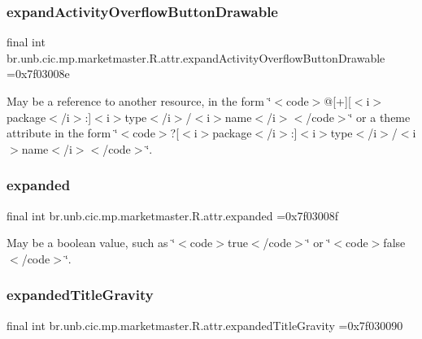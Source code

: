 \subsubsection{\texorpdfstring{expand\+Activity\+Overflow\+Button\+Drawable}{expandActivityOverflowButtonDrawable}}
{\footnotesize\ttfamily final int br.\+unb.\+cic.\+mp.\+marketmaster.\+R.\+attr.\+expand\+Activity\+Overflow\+Button\+Drawable =0x7f03008e\hspace{0.3cm}{\ttfamily [static]}}

May be a reference to another resource, in the form \char`\"{}$<$code$>$@\mbox{[}+\mbox{]}\mbox{[}$<$i$>$package$<$/i$>$\+:\mbox{]}$<$i$>$type$<$/i$>$/$<$i$>$name$<$/i$>$$<$/code$>$\char`\"{} or a theme attribute in the form \char`\"{}$<$code$>$?\mbox{[}$<$i$>$package$<$/i$>$\+:\mbox{]}$<$i$>$type$<$/i$>$/$<$i$>$name$<$/i$>$$<$/code$>$\char`\"{}. \mbox{\label{classbr_1_1unb_1_1cic_1_1mp_1_1marketmaster_1_1R_1_1attr_af0819ad4f4e9a998555b89b7beeaa2ed}} 
\subsubsection{\texorpdfstring{expanded}{expanded}}
{\footnotesize\ttfamily final int br.\+unb.\+cic.\+mp.\+marketmaster.\+R.\+attr.\+expanded =0x7f03008f\hspace{0.3cm}{\ttfamily [static]}}

May be a boolean value, such as \char`\"{}$<$code$>$true$<$/code$>$\char`\"{} or \char`\"{}$<$code$>$false$<$/code$>$\char`\"{}. \mbox{\label{classbr_1_1unb_1_1cic_1_1mp_1_1marketmaster_1_1R_1_1attr_ac7cacddcdb842814bdf69170e903aaf9}} 
\subsubsection{\texorpdfstring{expanded\+Title\+Gravity}{expandedTitleGravity}}
{\footnotesize\ttfamily final int br.\+unb.\+cic.\+mp.\+marketmaster.\+R.\+attr.\+expanded\+Title\+Gravity =0x7f030090\hspace{0.3cm}{\ttfamily [static]}}

